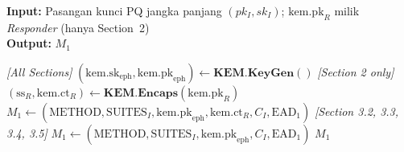 \documentclass{easychair}
\begin{document}
\begin{algorithm}[H]
\caption{Step 1 (\emph{Initiator}) --- Menyiapkan $M_1$}
\label{alg:step1}
\textbf{Input:} Pasangan kunci PQ jangka panjang $(pk_I, sk_I)$; $\mathrm{kem.pk}_R$ milik \emph{Responder} (hanya Section~2) \\
\textbf{Output:} $M_1$
\begin{algorithmic}[1]
\Statex \textit{[All Sections]}
\State $(\mathrm{kem.sk}_{\mathrm{eph}}, \mathrm{kem.pk}_{\mathrm{eph}}) \gets \mathbf{KEM.KeyGen}()$
\Statex \textit{[Section 2 only]}
\State $(\mathrm{ss}_R, \mathrm{kem.ct}_R) \gets \mathbf{KEM.Encaps}(\mathrm{kem.pk}_R)$
\State $M_1 \gets (\mathrm{METHOD}, \mathrm{SUITES}_I, \mathrm{kem.pk}_{\mathrm{eph}}, \mathrm{kem.ct}_R, C_I, \mathrm{EAD}_1)$
\Statex \textit{[Section 3.2, 3.3, 3.4, 3.5]}
\State $M_1 \gets (\mathrm{METHOD}, \mathrm{SUITES}_I, \mathrm{kem.pk}_{\mathrm{eph}}, C_I, \mathrm{EAD}_1)$
\State \Return $M_1$
\end{algorithmic}
\end{algorithm}
\end{document}
